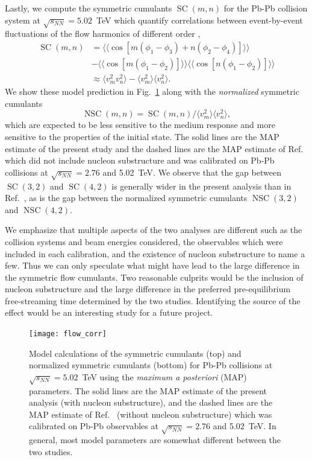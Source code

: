\documentclass[aps,prc,reprint,amsmath,nofootinbib]{revtex4-1}
\newcommand{\sqrts}{\sqrt{s_{NN}}}
\DeclareMathOperator{\SC}{SC}
\DeclareMathOperator{\NSC}{NSC}
\begin{document}
Lastly, we compute the symmetric cumulants $\SC(m,n)$ for the Pb-Pb collision system at $\sqrts=5.02$~TeV which quantify correlations between event-by-event fluctuations of the flow harmonics of different order \cite{Bilandzic:2013kga, ALICE:2016kpq},
\begin{align}
  \SC(m, n) &= \langle\langle \cos[m(\phi_1 - \phi_3) + n(\phi_2-\phi_4)]\rangle\rangle \nonumber \\
  \nonumber &- \langle\langle\cos[m(\phi_1-\phi_2)]\rangle\rangle\langle\langle\cos[n(\phi_1-\phi_2)]\rangle\rangle \label{eq:scmn}\\
  &\approx \langle v_m^2 v_n^2 \rangle - \langle v_m^2\rangle\langle v_n^2\rangle.
\end{align}
We show these model prediction in Fig.~\ref{fig:flow_corr} along with the \emph{normalized} symmetric cumulants
\begin{equation}
  \NSC(m,n) = \SC(m,n)/\langle v_m^2\rangle\langle v_n^2\rangle,
\end{equation}
which are expected to be less sensitive to the medium response and more sensitive to the properties of the initial state.
The solid lines are the MAP estimate of the present study and the dashed lines are the MAP estimate of Ref.~\cite{Bernhard:2018hnz} which did not include nucleon substructure and was calibrated on Pb-Pb collisions at $\sqrts=2.76$ and 5.02~TeV.
We observe that the gap between $\SC(3,2)$ and $\SC(4,2)$ is generally wider in the present analysis than in Ref.~\cite{Bernhard:2018hnz}, as is the gap between the normalized symmetric cumulants $\NSC(3,2)$ and $\NSC(4,2)$.

We emphasize that multiple aspects of the two analyses are different such as the collision systems and beam energies considered, the observables which were included in each calibration, and the existence of nucleon substructure to name a few.
Thus we can only speculate what might have lead to the large difference in the symmetric flow cumulants.
Two reasonable culprits would be the inclusion of nucleon substructure and the large difference in the preferred pre-equilibrium free-streaming time determined by the two studies.
Identifying the source of the effect would be an interesting study for a future project.

\begin{figure}
  \texttt{[image: flow\_corr]}
  \caption{
    \label{fig:flow_corr}
    Model calculations of the symmetric cumulants (top) and normalized symmetric cumulants (bottom) for Pb-Pb collisions at $\sqrts=5.02$~TeV using the \emph{maximum a posteriori} (MAP) parameters.
    The solid lines are the MAP estimate of the present analysis (with nucleon substructure), and the dashed lines are the MAP estimate of Ref.~\cite{Bernhard:2018hnz} (without nucleon substructure) which was calibrated on Pb-Pb observables at $\sqrts=2.76$ and 5.02~TeV.
    In general, most model parameters are somewhat different between the two studies.
  }
\end{figure}
\end{document}
